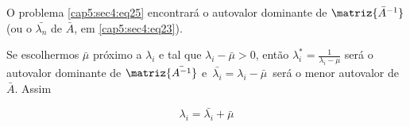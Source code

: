 O problema \ref{cap5:sec4:eq25} encontrará o autovalor dominante de $ \matriz{\bar{A}^{-1}} $ (ou o $ \bar{\lambda_n} $ de $ \bar{A} $, em \ref{cap5:sec4:eq23}).

Se escolhermos $ \bar{\mu} $ próximo a $ \lambda_i $ e tal que $ \lambda_i - \bar{\mu} > 0 $, então $ \lambda_i^* = \displaystyle \frac{1}{\lambda_i - \mu} $ será o autovalor dominante de $ \matriz{\bar{A^{-1}}} $ e $ \, \bar{\lambda_i} = \lambda_i - \bar{\mu} \, $ será o menor autovalor de $ \bar{A} $. Assim

\begin{equation}
 \label{cap5:sec4:eq27}
 \lambda_i = \bar{\lambda_i} + \bar{\mu}
\end{equation}
